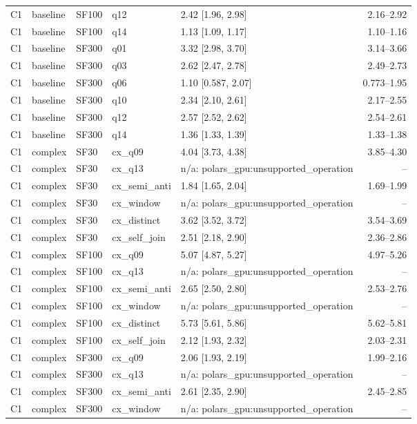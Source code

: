 \begin{longtable}{lllllr}
C1 & baseline & SF100 & q12 & 2.42 [1.96, 2.98] & 2.16--2.92 \\
C1 & baseline & SF100 & q14 & 1.13 [1.09, 1.17] & 1.10--1.16 \\
C1 & baseline & SF300 & q01 & 3.32 [2.98, 3.70] & 3.14--3.66 \\
C1 & baseline & SF300 & q03 & 2.62 [2.47, 2.78] & 2.49--2.73 \\
C1 & baseline & SF300 & q06 & 1.10 [0.587, 2.07] & 0.773--1.95 \\
C1 & baseline & SF300 & q10 & 2.34 [2.10, 2.61] & 2.17--2.55 \\
C1 & baseline & SF300 & q12 & 2.57 [2.52, 2.62] & 2.54--2.61 \\
C1 & baseline & SF300 & q14 & 1.36 [1.33, 1.39] & 1.33--1.38 \\
C1 & complex & SF30 & cx\_q09 & 4.04 [3.73, 4.38] & 3.85--4.30 \\
C1 & complex & SF30 & cx\_q13 & n/a: polars\_gpu:unsupported\_operation & -- \\
C1 & complex & SF30 & cx\_semi\_anti & 1.84 [1.65, 2.04] & 1.69--1.99 \\
C1 & complex & SF30 & cx\_window & n/a: polars\_gpu:unsupported\_operation & -- \\
C1 & complex & SF30 & cx\_distinct & 3.62 [3.52, 3.72] & 3.54--3.69 \\
C1 & complex & SF30 & cx\_self\_join & 2.51 [2.18, 2.90] & 2.36--2.86 \\
C1 & complex & SF100 & cx\_q09 & 5.07 [4.87, 5.27] & 4.97--5.26 \\
C1 & complex & SF100 & cx\_q13 & n/a: polars\_gpu:unsupported\_operation & -- \\
C1 & complex & SF100 & cx\_semi\_anti & 2.65 [2.50, 2.80] & 2.53--2.76 \\
C1 & complex & SF100 & cx\_window & n/a: polars\_gpu:unsupported\_operation & -- \\
C1 & complex & SF100 & cx\_distinct & 5.73 [5.61, 5.86] & 5.62--5.81 \\
C1 & complex & SF100 & cx\_self\_join & 2.12 [1.93, 2.32] & 2.03--2.31 \\
C1 & complex & SF300 & cx\_q09 & 2.06 [1.93, 2.19] & 1.99--2.16 \\
C1 & complex & SF300 & cx\_q13 & n/a: polars\_gpu:unsupported\_operation & -- \\
C1 & complex & SF300 & cx\_semi\_anti & 2.61 [2.35, 2.90] & 2.45--2.85 \\
C1 & complex & SF300 & cx\_window & n/a: polars\_gpu:unsupported\_operation & -- \\

\end{longtable}
